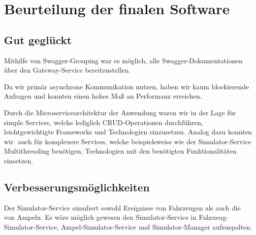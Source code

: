\section{Beurteilung der finalen Software}

\subsection{Gut geglückt}

Mithilfe von Swagger-Grouping war es möglich, alle Swagger-Dokumentationen über den Gateway-Service bereitzustellen.

Da wir primär asynchrone Kommunikation nutzen, haben wir kaum blockierende Anfragen und konnten einen hohes Maß an Performanz erreichen.

Durch die Microservicearchitektur der Anwendung waren wir in der Lage für simple Services, welche lediglich CRUD-Operationen durchführen, leichtgewichtigte Frameworks und Technologien
einzusetzen.
Analog dazu konnten wir auch für komplexere Services, welche beispielsweise wie der Simulator-Service Multithreading benötigen, Technologien mit den benötigten Funktionalitäten einsetzen.

\subsection{Verbesserungsmöglichkeiten}

Der Simulator-Service simuliert sowohl Ereignisse von Fahrzeugen als auch die von Ampeln.
Es wäre möglich gewesen den Simulator-Service in Fahrzeug-Simulator-Service, Ampel-Simulator-Service und Simulator-Manager aufzuspalten.
